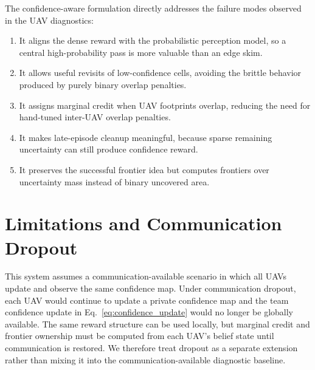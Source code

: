 \documentclass{article}
\begin{document}
The confidence-aware formulation directly addresses the failure modes observed
in the UAV diagnostics:
\begin{enumerate}[leftmargin=1.5em]
    \item It aligns the dense reward with the probabilistic perception model,
    so a central high-probability pass is more valuable than an edge skim.
    \item It allows useful revisits of low-confidence cells, avoiding the
    brittle behavior produced by purely binary overlap penalties.
    \item It assigns marginal credit when UAV footprints overlap, reducing the
    need for hand-tuned inter-UAV overlap penalties.
    \item It makes late-episode cleanup meaningful, because sparse remaining
    uncertainty can still produce confidence reward.
    \item It preserves the successful frontier idea but computes frontiers over
    uncertainty mass instead of binary uncovered area.
\end{enumerate}

\section{Limitations and Communication Dropout}

This system assumes a communication-available scenario in which all UAVs update
and observe the same confidence map. Under communication dropout, each UAV would
continue to update a private confidence map and the team confidence update in
Eq.~\ref{eq:confidence_update} would no longer be globally available. The same
reward structure can be used locally, but marginal credit and frontier ownership
must be computed from each UAV's belief state until communication is restored.
We therefore treat dropout as a separate extension rather than mixing it into
the communication-available diagnostic baseline.
\end{document}
